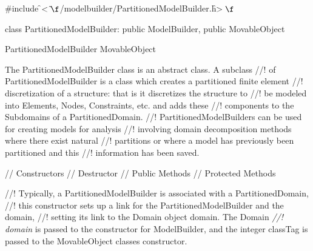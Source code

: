 
\indent \#include \f$<\tilde{ }\f$/modelbuilder/PartitionedModelBuilder.h\f$>\f$

\indent class PartitionedModelBuilder: public ModelBuilder, public MovableObject

\indent  PartitionedModelBuilder
\indent  MovableObject
\indent{}

\indent The PartitionedModelBuilder class is an abstract class. A subclass
//! of PartitionedModelBuilder is a class which creates a partitioned finite element
//! discretization of a structure: that is it discretizes the structure to
//! be modeled into Elements, Nodes, Constraints, etc. and adds these
//! components to the Subdomains of a PartitionedDomain.
//! PartitionedModelBuilders can be used for creating models for analysis
//! involving domain decomposition methods where there exist natural
//! partitions or where a model has previously been partitioned and this
//! information has been saved.

\indent\indent // Constructors 
\indent{} 
\indent{}
\indent{}
\indent\indent // Destructor 
\indent{}
\indent\indent // Public Methods 
\indent{}
\indent{} 
\indent{}
\indent\indent // Protected Methods 
\indent{}

//! Typically, a PartitionedModelBuilder is associated with a PartitionedDomain,
//! this constructor sets up a link for the PartitionedModelBuilder and the domain,
//! setting its link to the Domain object \p domain. The Domain {\em
//! domain} is passed to the constructor for ModelBuilder, and the integer
\p classTag is passed to the MovableObject classes constructor.

